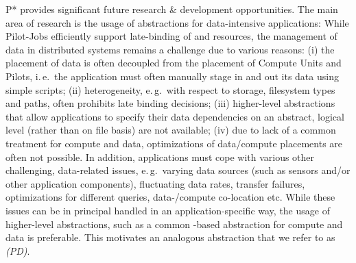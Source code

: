 \documentclass{sig-alternate}
\begin{document}

P* provides significant future research \& development opportunities. The main
area of research is the usage of \pilot abstractions for data-intensive
applications: While Pilot-Jobs efficiently support late-binding of
\computeunits and resources, the management of data in distributed systems
remains a challenge due to various reasons: (i) the placement of data is often
decoupled from the placement of Compute Units and Pilots, i.\,e.\ the
application must often manually stage in and out its data using simple
scripts; (ii) heterogeneity, e.\,g.\ with respect to storage, filesystem types
and paths, often prohibits  late binding decisions;
(iii) higher-level abstractions that allow applications to specify their data
dependencies on an abstract, logical level (rather than on file basis) are not
available; (iv) due to lack of a common treatment for compute and data,
optimizations of data/compute placements are often not possible. In addition,
applications must cope with various other challenging, data-related issues,
e.\,g.\ varying data sources (such as sensors and/or other application
components), fluctuating data rates, transfer failures, optimizations for
different queries, data-/compute co-location etc. While these issues can be in
principal handled in an application-specific way, the usage of higher-level
abstractions, such as a common \pilot-based abstraction for compute and data
is preferable. This motivates an analogous abstraction that we refer to as
\emph{\pilotdata (PD)}.





 
\end{document}
